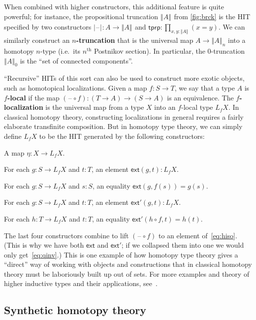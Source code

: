 \documentclass[12pt]{article}
\def\tprod{\textstyle\prod}
\newcommand{\blank}{\mathord{\hspace{1pt}\text{--}\hspace{1pt}}}
\numberwithin{equation}{section}
\newcommand{\trunc}[2]{\mathopen{}\left\Vert #2\right\Vert_{#1}\mathclose{}}
\newcommand{\tproj}[3][]{\mathopen{}\left|#3\right|_{#2}^{#1}\mathclose{}}
\newcommand{\brck}[1]{\trunc{}{#1}}
\newcommand{\bproj}[1]{\tproj{}{#1}}
\begin{document}
When combined with higher constructors, this additional feature is quite powerful; for instance, the propositional truncation $\brck{A}$ from \cref{fig:brck} is the HIT specified by two constructors $\bproj{\blank} : A\to\brck{A}$ and $\mathsf{tprp}:\tprod_{x,y:\brck{A}} (x=y)$.
We can similarly construct an \textbf{$n$-truncation} that is the universal map $A\to \trunc n A$ into a homotopy $n$-type (i.e.\ its $n^{\mathrm{th}}$ Postnikov section).
In particular, the $0$-truncation $\trunc 0 A$ is the ``set of connected components''. %

``Recursive'' HITs of this sort can also be used to construct more exotic objects, such as homotopical localizations.
Given a map $f:S\to T$, we say that a type $A$ is \textbf{$f$-local} if the map $(\blank\circ f):(T\to A)\to (S\to A)$ is an equivalence.
The \textbf{$f$-localization} is the universal map from a type $X$ into an $f$-local type $L_f X$.
In classical homotopy theory, constructing localizations in general requires a fairly elaborate transfinite composition.
But in homotopy type theory, we can simply define $L_f X$ to be the HIT generated by the following constructors:
\begin{compactitem}
\item A map $\eta : X\to L_f X$.
\item For each $g:S\to L_f X$ and $t:T$, an element $\mathsf{ext}(g,t):L_f X$.
\item For each $g:S\to L_f X$ and $s:S$, an equality $\mathsf{ext}(g,f(s)) = g(s)$.
\item For each $g:S\to L_f X$ and $t:T$, an element $\mathsf{ext}'(g,t):L_f X$.
\item For each $h:T\to L_f X$ and $t:T$, an equality $\mathsf{ext}'(h\circ f,t)=h(t)$.
\end{compactitem}
The last four constructors combine to lift $(\blank\circ f)$ to an element of~\eqref{eq:hiso}.  (This is why we have both $\mathsf{ext}$ and $\mathsf{ext}'$; if we collapsed them into one we would only get~\eqref{eq:qinv}.)
This is one example of how homotopy type theory gives a ``direct'' way of working with objects and constructions that in classical homotopy theory must be laboriously built up out of sets.
For more examples and theory of higher inductive types and their applications, see~\cite[Chapter 6]{hottbook}.


\subsection{Synthetic homotopy theory}
\label{sec:synth-homot-theory}
\end{document}
